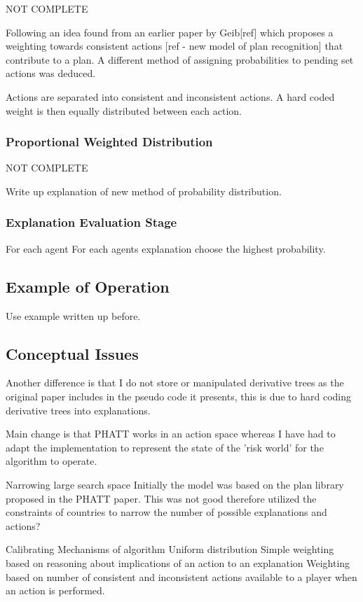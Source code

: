 \documentclass[parskip]{cs4rep}
\begin{document}
NOT COMPLETE

Following an idea found from an earlier paper by Geib[ref] which proposes a weighting towards consistent actions [ref - new model of plan recognition] that contribute to a plan. A different method of assigning probabilities to pending set actions was deduced.

Actions are separated into consistent and inconsistent actions. A hard coded weight is then equally distributed between each action.

\subsubsection{Proportional Weighted Distribution}

NOT COMPLETE

Write up explanation of new method of probability distribution.

\subsubsection{Explanation Evaluation Stage}

For each agent
For each agents explanation choose the highest probability.

\subsection{Example of Operation}

Use example written up before.

\subsection{Conceptual Issues}

Another difference is that I do not store or manipulated derivative trees as the original paper includes in the pseudo code it presents, this is due to hard coding derivative trees into explanations.

Main change is that PHATT works in an action space whereas I have had to adapt the implementation to represent the state of the 'risk world' for the algorithm to operate.

Narrowing large search space
Initially the model was based on the plan library proposed in the PHATT paper. This was not good therefore utilized the constraints of countries to narrow the number of possible explanations and actions?

Calibrating Mechanisms of algorithm
Uniform distribution
Simple weighting based on reasoning about implications of an action to an explanation
Weighting based on number of consistent and inconsistent actions available to a player when an action is performed.
\end{document}
